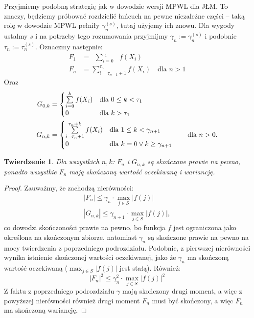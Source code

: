 \documentclass[a4paper]{article}
\theoremstyle{defn}
\theoremstyle{theorem}
\newtheorem{theorem}[defn]{Twierdzenie}
\theoremstyle{lemma}
\theoremstyle{cor}
\theoremstyle{fact}
\begin{document}
Przyjmiemy podobną strategię jak w dowodzie wersji MPWL dla JŁM. To znaczy, będziemy próbować rozdzielić łańcuch na pewne niezależne części – taką rolę w dowodzie MPWL pełniły $\gamma_n^{(s)}$, tutaj użyjemy ich znowu. Dla wygody ustalmy $s$ i na potrzeby tego rozumowania przyjmijmy $\gamma_n := \gamma_n^{(s)}$ i podobnie $\tau_n := \tau_n^{(s)}$. 
Oznaczmy następnie:
\begin{align*}
    F_1 &= \,\,\,\sum\limits_{i = 0}^{\tau_1} \,\,\,\,f(X_i)\\
    F_n &= \sum\limits_{i = \tau_{n-1}+1}^{\tau_n} f(X_i) \quad \text{dla $n > 1$}
\end{align*}
Oraz 
\begin{align*}
    G_{0, k} &= \begin{cases}
    \sum\limits_{i = 0}^{k} f(X_i) &\text{dla $0 \leq k < \tau_{1}$}\\
    0  &\text{dla $k > \tau_1$}
    \end{cases}
    \\
    G_{n, k} &= \begin{cases}\sum\limits_{i = \tau_n+1}^{\tau_n+k} f(X_i) &\text{dla $1 \leq k < \gamma_{n+1}$}\\
    0 &\text{dla $k=0 \lor k \geq \gamma_{n+1}$}
    \end{cases} \text{\quad\quad dla $n > 0.$}
\end{align*}
\begin{theorem}\label{theorem2.6.2}
Dla wszystkich $n,k$: $F_n$ i $G_{n,k}$ są skończone prawie na pewno, ponadto wszystkie $F_n$ mają skończoną wartość oczekiwaną i wariancję.
\end{theorem}
\begin{proof}
Zauważmy, że zachodzą nierówności:
\begin{align*}
    |F_n| \leq \gamma_n \cdot \max_{j \in S} |f(j)|\\
    |G_{n,k}| \leq \gamma_{n+1} \cdot \max_{j \in S} |f(j)|,
\end{align*}
co dowodzi skończoności prawie na pewno, bo funkcja $f$ jest ograniczona jako określona na skończonym zbiorze, natomiast $\gamma_n$ są skończone prawie na pewno na mocy twierdzenia z poprzedniego podrozdziału. Podobnie, z pierwszej nierówności wynika istnienie skończonej wartości oczekiwanej, jako że $\gamma_n$ ma skończoną wartość oczekiwaną ($\max_{j \in S} |f(j)|$ jest stałą). Również:
$$|F_n|^2 \leq \gamma_n^2 \cdot \max_{j \in S} |f(j)|^2$$
Z faktu z poprzedniego podrozdziału $\gamma$ mają skończony drugi moment, a więc z powyższej nierówności również drugi moment $F_n$ musi być skończony, a więc $F_n$ ma skończoną wariancję.
\end{proof}
\end{document}
